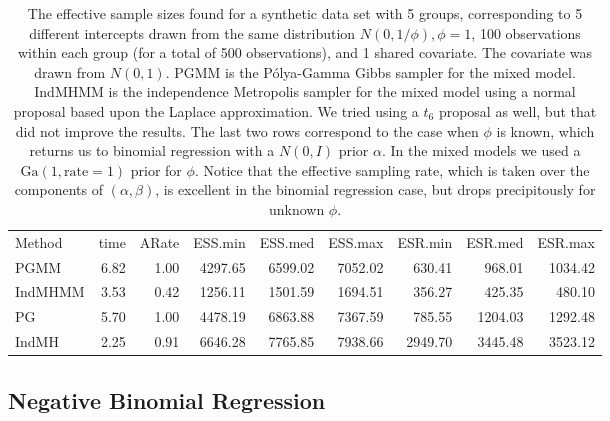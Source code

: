 \documentclass{article}
\newcommand{\Polya}{P\'{o}lya}
\begin{document}
\begin{table}
\label{tab:mm-example}
\begin{tabular}{l r r r r r r r r } 
 Method  &     time &    ARate &  ESS.min &  ESS.med &  ESS.max &  ESR.min &  ESR.med &  ESR.max \\ 
   PGMM  &     6.82 &     1.00 &  4297.65 &  6599.02 &  7052.02 &   630.41 &   968.01 &  1034.42 \\ 
IndMHMM  &     3.53 &     0.42 &  1256.11 &  1501.59 &  1694.51 &   356.27 &   425.35 &   480.10 \\ 
     PG  &     5.70 &     1.00 &  4478.19 &  6863.88 &  7367.59 &   785.55 &  1204.03 &  1292.48 \\ 
  IndMH  &     2.25 &     0.91 &  6646.28 &  7765.85 &  7938.66 &  2949.70 &  3445.48 &  3523.12
 \end{tabular}
 \caption{
   The effective sample sizes found for a synthetic data set with 
   5 groups, corresponding to 5 different intercepts drawn from the same
   distribution $N(0, 1/\phi), \phi=1$, 100 observations within each group (for a total of
   500 observations), and 1 shared covariate.  The covariate was drawn from
   $N(0,1)$.  PGMM is the \Polya-Gamma Gibbs sampler for the mixed model.  IndMHMM
   is the independence Metropolis sampler for the mixed model using a normal
   proposal based upon the Laplace approximation.  We tried using a $t_6$ proposal
   as well, but that did not improve the results.  The last two rows correspond to
   the case when $\phi$ is known, which returns us to binomial regression with a
   $N(0, I)$ prior $\alpha$.  In the mixed models we used a $\text{Ga}(1,
   \text{rate}=1)$ prior for $\phi$.  Notice that the effective sampling rate,
   which is taken over the components of $(\alpha, \beta)$, is
   excellent in the binomial regression case, but drops precipitously for
   unknown $\phi$.
 }
\end{table}

\subsection{Negative Binomial Regression}
\end{document}
